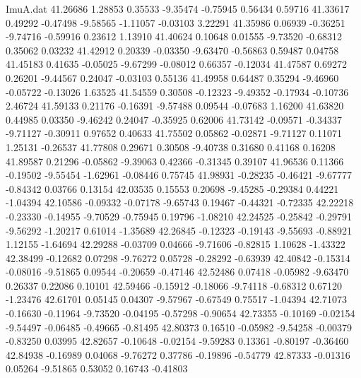 \begin{filecontents}{ImuA.dat}
  41.26686    1.28853    0.35533   -9.35474   -0.75945    0.56434    0.59716
  41.33617    0.49292   -0.47498   -9.58565   -1.11057   -0.03103    3.22291
  41.35986    0.06939   -0.36251   -9.74716   -0.59916    0.23612    1.13910
  41.40624    0.10648    0.01555   -9.73520   -0.68312    0.35062    0.03232
  41.42912    0.20339   -0.03350   -9.63470   -0.56863    0.59487    0.04758
  41.45183    0.41635   -0.05025   -9.67299   -0.08012    0.66357   -0.12034
  41.47587    0.69272    0.26201   -9.44567    0.24047   -0.03103    0.55136
  41.49958    0.64487    0.35294   -9.46960   -0.05722   -0.13026    1.63525
  41.54559    0.30508   -0.12323   -9.49352   -0.17934   -0.10736    2.46724
  41.59133    0.21176   -0.16391   -9.57488    0.09544   -0.07683    1.16200
  41.63820    0.44985    0.03350   -9.46242    0.24047   -0.35925    0.62006
  41.73142   -0.09571   -0.34337   -9.71127   -0.30911    0.97652    0.40633
  41.75502    0.05862   -0.02871   -9.71127    0.11071    1.25131   -0.26537
  41.77808    0.29671    0.30508   -9.40738    0.31680    0.41168    0.16208
  41.89587    0.21296   -0.05862   -9.39063    0.42366   -0.31345    0.39107
  41.96536    0.11366   -0.19502   -9.55454   -1.62961   -0.08446    0.75745
  41.98931   -0.28235   -0.46421   -9.67777   -0.84342    0.03766    0.13154
  42.03535    0.15553    0.20698   -9.45285   -0.29384    0.44221   -1.04394
  42.10586   -0.09332   -0.07178   -9.65743    0.19467   -0.44321   -0.72335
  42.22218   -0.23330   -0.14955   -9.70529   -0.75945    0.19796   -1.08210
  42.24525   -0.25842   -0.29791   -9.56292   -1.20217    0.61014   -1.35689
  42.26845   -0.12323   -0.19143   -9.55693   -0.88921    1.12155   -1.64694
  42.29288   -0.03709    0.04666   -9.71606   -0.82815    1.10628   -1.43322
  42.38499   -0.12682    0.07298   -9.76272    0.05728   -0.28292   -0.63939
  42.40842   -0.15314   -0.08016   -9.51865    0.09544   -0.20659   -0.47146
  42.52486    0.07418   -0.05982   -9.63470    0.26337    0.22086    0.10101
  42.59466   -0.15912   -0.18066   -9.74118   -0.68312    0.67120   -1.23476
  42.61701    0.05145    0.04307   -9.57967   -0.67549    0.75517   -1.04394
  42.71073   -0.16630   -0.11964   -9.73520   -0.04195   -0.57298   -0.90654
  42.73355   -0.10169   -0.02154   -9.54497   -0.06485   -0.49665   -0.81495
  42.80373    0.16510   -0.05982   -9.54258   -0.00379   -0.83250    0.03995
  42.82657   -0.10648   -0.02154   -9.59283    0.13361   -0.80197   -0.36460
  42.84938   -0.16989    0.04068   -9.76272    0.37786   -0.19896   -0.54779
  42.87333   -0.01316    0.05264   -9.51865    0.53052    0.16743   -0.41803

\end{filecontents}
